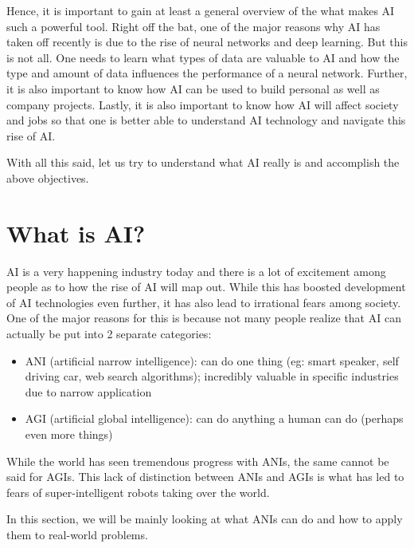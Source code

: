 \documentclass{article}[a4paper,12pt]
\theoremstyle{definition}
\begin{document}
Hence, it is important to gain at least a general overview of the what makes AI such a powerful tool. Right off the bat, one of the major reasons why AI has taken off recently is due to the rise of neural networks and deep learning. But this is not all. One needs to learn what types of data are valuable to AI and how the type and amount of data influences the performance of a neural network. Further, it is also important to know how AI can be used to build personal as well as company projects. Lastly, it is also important to know how AI will affect society and jobs so that one is better able to understand AI technology and navigate this rise of AI.
\vspace{6pt}

With all this said, let us try to understand what AI really is and accomplish the above objectives.

\hrulefill
\pagebreak
\section{What is AI?}
AI is a very happening industry today and there is a lot of excitement among people as to how the rise of AI will map out. While this has boosted development of AI technologies even further, it has also lead to irrational fears among society. One of the major reasons for this is because not many people realize that AI can actually be put into 2 separate categories:
\begin{itemize}
	\item ANI (artificial narrow intelligence): can do one thing (eg: smart speaker, self driving car, web search algorithms); incredibly valuable in specific industries due to narrow application
	\item AGI (artificial global intelligence): can do anything a human can do (perhaps even more things)
\end{itemize}
While the world has seen tremendous progress with ANIs, the same cannot be said for AGIs. This lack of distinction between ANIs and AGIs is what has led to fears of super-intelligent robots taking over the world.
\vspace{6pt}

In this section, we will be mainly looking at what ANIs can do and how to apply them to real-world problems.
\end{document}
